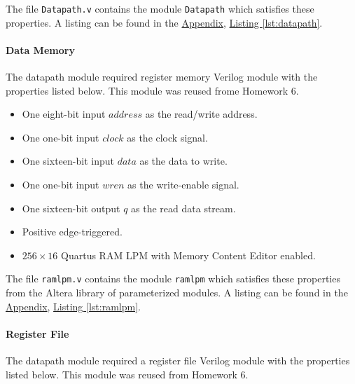The file \verb|Datapath.v| contains the module \verb|Datapath| which satisfies these properties.
A listing can be found in the \hyperref[sec:appendix]{Appendix}, \hyperref[lst:datapath]{Listing \ref*{lst:datapath}}.

\paragraph{Data Memory} \label{par:regmem}

The datapath module required register memory Verilog module with the properties listed below.
This module was reused frome Homework 6.

\begin{itemize}
    \item One eight-bit input $address$ as the read/write address.
    \item One one-bit input $clock$ as the clock signal.
    \item One sixteen-bit input $data$ as the data to write.
    \item One one-bit input $wren$ as the write-enable signal.
    \item One sixteen-bit output $q$ as the read data stream.
    \item Positive edge-triggered.
    \item $256 \times 16$ Quartus RAM LPM with Memory Content Editor enabled.
\end{itemize}

The file \verb|ramlpm.v| contains the module \verb|ramlpm| which satisfies these properties from the Altera library of parameterized modules.
A listing can be found in the \hyperref[sec:appendix]{Appendix}, \hyperref[lst:ramlpm]{Listing \ref*{lst:ramlpm}}.

\paragraph{Register File} \label{par:regfile}

The datapath module required a register file Verilog module with the properties listed below.
This module was reused from Homework 6.

